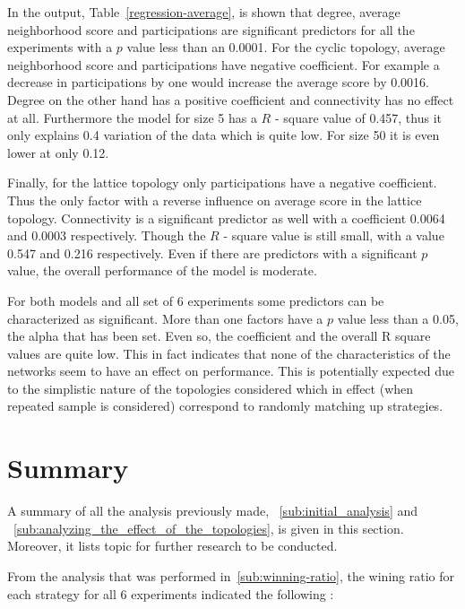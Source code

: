 In the output, Table~\ref{regression-average}, is shown that degree, average
neighborhood score and participations
are significant predictors for all the experiments with a \(p\) value less than
an 0.0001.
For the cyclic topology, average neighborhood score and participations have negative
coefficient. For example a decrease in participations by one would increase
the average score by 0.0016. Degree on the other hand has a positive coefficient
and connectivity has no effect at all. Furthermore the model for size 5 has
a \(R\) - square value of 0.457, thus it only explains 0.4 variation of the data which is
quite low. For size 50 it is even lower at only 0.12.

Finally, for the lattice topology only participations have a negative coefficient.
Thus the only factor with a reverse influence on average score in the lattice topology.
Connectivity is a significant predictor as well with a coefficient 0.0064 and
0.0003 respectively. Though the \(R\) - square value is still  small,
with a value 0.547 and 0.216 respectively.
Even if there are predictors with a significant \(p\) value, the overall
performance of the model is moderate.

For both models and all set of 6 experiments some predictors can be characterized
as significant. More than one factors have a \(p\) value less than a 0.05, the alpha
that has been set. Even so, the coefficient and the overall R square values are
quite low. This in fact indicates
that none of the characteristics of the networks seem to have an effect on
performance. This is potentially expected due to the simplistic nature of the
topologies considered which in effect (when repeated sample is considered)
correspond to randomly matching up strategies.

\section{Summary}
\label{sub:summary}

A summary of all the analysis previously made, ~\ref{sub:initial_analysis} and
~\ref{sub:analyzing_the_effect_of_the_topologies}, is given in this section.
Moreover, it lists topic for further research to be conducted.

From the analysis that was performed in~\ref{sub:winning-ratio}, the wining ratio
for each strategy for all 6 experiments indicated the following :

